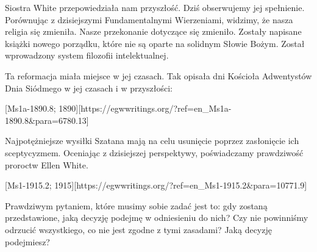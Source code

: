 Siostra White przepowiedziała nam przyszłość. Dziś obserwujemy jej spełnienie. Porównując  z dzisiejszymi Fundamentalnymi Wierzeniami, widzimy, że nasza religia się zmieniła. Nasze przekonanie dotyczące  się zmieniło. Zostały napisane książki nowego porządku, które nie są oparte na solidnym Słowie Bożym. Został wprowadzony system filozofii intelektualnej.

Ta reformacja miała miejsce w jej czasach. Tak opisała dni Kościoła Adwentystów Dnia Siódmego w jej czasach i w przyszłości:

[Ms1a-1890.8; 1890][https://egwwritings.org/?ref=en\_Ms1a-1890.8&para=6780.13]

Najpotężniejsze wysiłki Szatana mają na celu usunięcie  poprzez zasłonięcie ich sceptycyzmem. Oceniając z dzisiejszej perspektywy, poświadczamy prawdziwość proroctw Ellen White.

[Ms1-1915.2; 1915][https://egwwritings.org/?ref=en\_Ms1-1915.2&para=10771.9]

Prawdziwym pytaniem, które musimy sobie zadać  jest to: gdy  zostaną przedstawione, jaką decyzję podejmę w odniesieniu do nich? Czy nie powinniśmy odrzucić wszystkiego, co nie jest zgodne z tymi zasadami? Jaką decyzję podejmiesz?


% 

% 